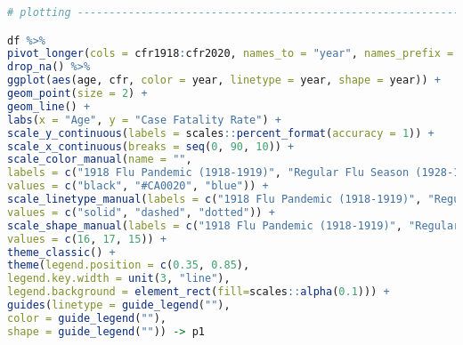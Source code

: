 \begin{lstlisting}[language=R,caption={Plotting for Figure \ref{fig_cfr}: Case Fatality Rates of Pneumonia and Influenza during the 1918 Flu Pandemic, 1928, and Covid-19 in 2020}, label=lst_cfr_plot]
# plotting ----------------------------------------------------------------

df %>% 
pivot_longer(cols = cfr1918:cfr2020, names_to = "year", names_prefix = "cfr", values_to = "cfr") %>% 
drop_na() %>%
ggplot(aes(age, cfr, color = year, linetype = year, shape = year)) +
geom_point(size = 2) +
geom_line() +
labs(x = "Age", y = "Case Fatality Rate") +
scale_y_continuous(labels = scales::percent_format(accuracy = 1)) +
scale_x_continuous(breaks = seq(0, 90, 10)) +
scale_color_manual(name = "",
labels = c("1918 Flu Pandemic (1918-1919)", "Regular Flu Season (1928-1929)", "Covid-19 (2020)"),
values = c("black", "#CA0020", "blue")) +
scale_linetype_manual(labels = c("1918 Flu Pandemic (1918-1919)", "Regular Flu Season (1928-1929)", "Covid-19 (2020)"),
values = c("solid", "dashed", "dotted")) +
scale_shape_manual(labels = c("1918 Flu Pandemic (1918-1919)", "Regular Flu Season (1928-1929)", "Covid-19 (2020)"),
values = c(16, 17, 15)) +
theme_classic() +
theme(legend.position = c(0.35, 0.85),
legend.key.width = unit(3, "line"),
legend.background = element_rect(fill=scales::alpha(0.1))) +
guides(linetype = guide_legend(""),
color = guide_legend(""),
shape = guide_legend("")) -> p1

\end{lstlisting}